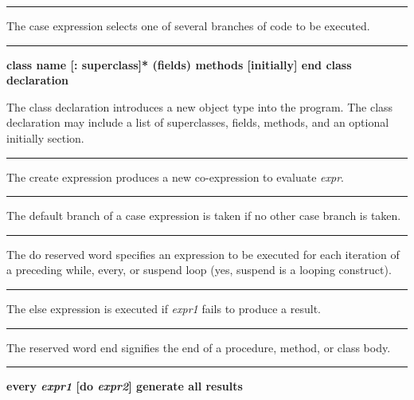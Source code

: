 \bigskip\hrule\vspace{0.1cm}

\noindent
The \textsf{case} expression selects one of
several branches of code to be executed.

\bigskip\hrule\vspace{0.1cm}
{\bf \textbf{class} name [: superclass]*
(fields) methods [initially] end \hfill class declaration}

\noindent
{}The \textsf{class} declaration introduces a new
object type into the program. The \textsf{class} declaration may
include a list of superclasses, fields, methods, and an optional
initially section.

\bigskip\hrule\vspace{0.1cm}

\noindent
{}The \textsf{create} expression produces a new
co-expression to evaluate \textit{expr}.

\bigskip\hrule\vspace{0.1cm}

\noindent
{}The \textsf{default} branch of a case
expression is taken if no other case branch is taken.

\bigskip\hrule\vspace{0.1cm}

\noindent
{}The \textsf{do} reserved word specifies an
expression to be executed for each iteration of a preceding
\textsf{while}, \textsf{every}, or \textsf{suspend} loop (yes,
\textsf{suspend} is a looping construct).

\bigskip\hrule\vspace{0.1cm}

\noindent
{}The \textsf{else} expression is executed if \textit{expr1}
fails to produce a result.

\bigskip\hrule\vspace{0.1cm}

\noindent
{}The reserved word \textsf{end} signifies the end of a
procedure, method, or class body.

\bigskip\hrule\vspace{0.1cm}
{\bf \textbf{every} \textit{expr1} [do
\textit{expr2}] \hfill generate all results}

